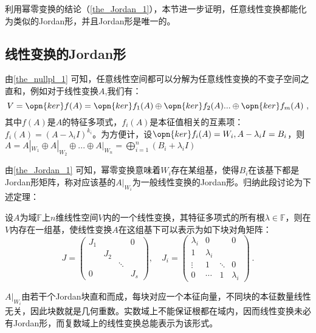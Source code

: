 

\begin{issues}
\issueTODO
\end{issues}

利用幂零变换的结论（\autoref{the_Jordan_1}），本节进一步证明，任意线性变换都能化为类似的Jordan形，并且Jordan形是唯一的。
\subsection{线性变换的Jordan形}
由\autoref{the_nullpl_1} 可知，任意线性空间都可以分解为任意线性变换的不变子空间之直和，例如对于线性变换$A$,我们有：
\begin{equation}
V=\opn{ker}f(A)=\opn{ker}f_1(A)\oplus\opn{ker}f_2(A)...\oplus\opn{ker}f_m(A)~,
\end{equation}
其中$f(A)$是$A$的特征多项式，$f_i(A)$是本征值相关的互素项：$f_i(A)=(A-\lambda_iI)^{k_i}$。为方便计，设$\opn{ker}f_i(A)=W_i,A-\lambda_iI=B_i$，则$A=A|_{W_1}\oplus A|_{W_2}\oplus...\oplus A|_{W_n}=\bigoplus^n_{i=1}(B_i+\lambda_iI)$

由\autoref{the_Jordan_1} 可知，幂零变换意味着$W_i$存在某组基，使得$B_i$在该基下都是Jordan形矩阵，称对应该基的$A|_{W_i}$为一般线性变换的Jordan形。归纳此段讨论为下述定理：
\begin{theorem}{}\label{the_ltrJor_1}
设$A$为域$\mathbb F$上$n$维线性空间$V$内的一个线性变换，其特征多项式的所有根$\lambda\in\mathbb F$，则在$V$内存在一组基，使线性变换$A$在这组基下可以表示为如下块对角矩阵：
\begin{equation}
J=\left(\begin{array}{cccc}
J_1 & & & 0 \\
& J_2 & & \\
& & \ddots & \\
0 & & & J_s
\end{array}\right), \quad J_i=\left(\begin{array}{cccc}
\lambda_i & 0 & & 0 \\
1& \lambda_i &  & \\
\vdots& 1& \ddots & 0 \\
0 &\cdots &1 & \lambda_i
\end{array}\right)~.
\end{equation}
\end{theorem}
$A|_{W_i}$由若干个Jordan块直和而成，每块对应一个本征向量，不同块的本征数量线性无关，因此块数就是几何重数。实数域上不能保证根都在域内，因而线性变换未必有Jordan形，而复数域上的线性变换总能表示为该形式。

